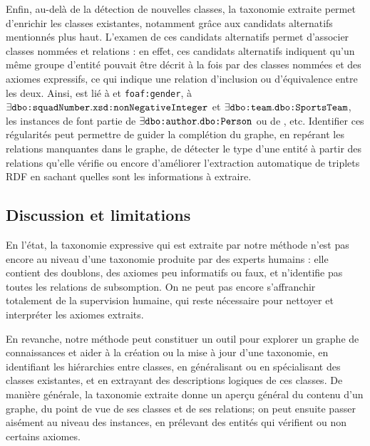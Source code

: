 Enfin, au-delà de la détection de nouvelles classes, la taxonomie extraite permet d'enrichir les classes existantes, notamment grâce aux candidats alternatifs mentionnés plus haut. L'examen de ces candidats alternatifs permet d'associer classes nommées et relations : en effet, ces candidats alternatifs indiquent qu'un même groupe d'entité pouvait être décrit à la fois par des classes nommées et des axiomes expressifs, ce qui indique une relation d'inclusion ou d'équivalence entre les deux. Ainsi,  est lié à  et \texttt{foaf:gender},  à $\exists \texttt{dbo:squadNumber}.\allowbreak \texttt{xsd:nonNegativeInteger}$ et $\exists \texttt{dbo:team}. \allowbreak \texttt{dbo:SportsTeam}$, les instances de  font partie de $\exists \texttt{dbo:author}. \allowbreak \texttt{dbo:Person}$ ou de , etc.
Identifier ces régularités peut permettre de guider la complétion du graphe, en repérant les relations manquantes dans le graphe, de détecter le type d'une entité à partir des relations qu'elle vérifie ou encore d'améliorer l'extraction automatique de triplets RDF en sachant quelles sont les informations à extraire.



\subsection{Discussion et limitations}
\label{subsec:texp-reslts-limits}

En l'état, la taxonomie expressive qui est extraite par notre méthode n'est pas encore au niveau d'une taxonomie produite par des experts humains : elle contient des doublons, des axiomes peu informatifs ou faux, et n'identifie pas toutes les relations de subsomption. On ne peut pas encore s'affranchir totalement de la supervision humaine, qui reste nécessaire pour nettoyer et interpréter les axiomes extraits. 

En revanche, notre méthode peut constituer un outil pour explorer un graphe de connaissances et aider à la création ou la mise à jour d'une taxonomie, en identifiant les hiérarchies entre classes, en généralisant ou en spécialisant des classes existantes, et en extrayant des descriptions logiques de ces classes. 
De manière générale, la taxonomie extraite donne un aperçu général du contenu d'un graphe, du point de vue de ses classes et de ses relations; on peut ensuite passer aisément au niveau des instances, en prélevant des entités qui vérifient ou non certains axiomes.

